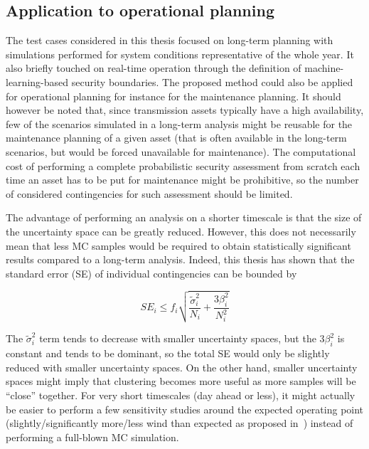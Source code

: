 
\subsection*{Application to operational planning}

The test cases considered in this thesis focused on long-term planning with simulations performed for system conditions representative of the whole year. It also briefly touched on real-time operation through the definition of machine-learning-based security boundaries. The proposed method could also be applied for operational planning for instance for the maintenance planning. It should however be noted that, since transmission assets typically have a high availability, few of the scenarios simulated in a long-term analysis might be reusable for the maintenance planning of a given asset (that is often available in the long-term scenarios, but would be forced unavailable for maintenance). The computational cost of performing a complete probabilistic security assessment from scratch each time an asset has to be put for maintenance might be prohibitive, so the number of considered contingencies for such assessment should be limited.

The advantage of performing an analysis on a shorter timescale is that the size of the uncertainty space can be greatly reduced. However, this does not necessarily mean that less MC samples would be required to obtain statistically significant results compared to a long-term analysis. Indeed, this thesis has shown that the standard error (SE) of individual contingencies can be bounded by

\begin{equation}
\label{eq:SE_bound_repeated}
SE_i \leq f_i \sqrt{\frac{\tilde{\sigma}_i^2}{N_i} + \frac{3 \beta_i^2}{N_i^2}}
\end{equation}

The \(\tilde{\sigma}_i^2\) term tends to decrease with smaller uncertainty spaces, but the \(3 \beta_i^2\) is constant and tends to be dominant, so the total SE would only be slightly reduced with smaller uncertainty spaces. On the other hand, smaller uncertainty spaces might imply that clustering becomes more useful as more samples will be ``close'' together. For very short timescales (day ahead or less), it might actually be easier to perform a few sensitivity studies around the expected operating point (\eg slightly/significantly more/less wind than expected as proposed in~\cite{Gamze_DIFERS}) instead of performing a full-blown MC simulation.


